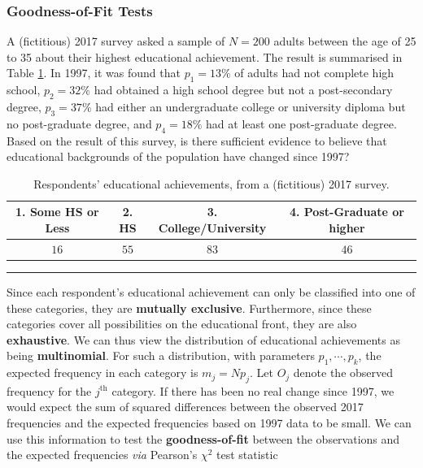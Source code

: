 
\subsubsection{Goodness-of-Fit Tests}
A (fictitious) 2017 survey asked a sample of $N=200$ adults between the age of 25 to 35 about their highest educational achievement. The result is summarised in Table \ref{tab:SA6}. In 1997, it was found that $p_1=13\%$ of adults had not complete high school, $p_2=32\%$ had obtained a high school degree but not a post-secondary degree, $p_3=37\%$ had either an undergraduate college or university diploma but no post-graduate degree, and $p_4=18\%$ had at least one post-graduate degree. Based on the result of this survey, is there sufficient evidence to believe that educational backgrounds of the population have changed since 1997?
     \begin{table}[!t]
         \centering
         \begin{tabular}{c c c c}
         \hline
        \textbf{1. Some HS or Less} & \textbf{2. HS} & \textbf{3. College/University} & \textbf{4. Post-Graduate or higher} \\
         \hline
        $16$ & $55$ & $83$ & $46$ \\
        \hline
         \end{tabular}
         \caption[\small Respondents' educational achievements]{\small Respondents' educational achievements, from a (fictitious) 2017 survey.}
         \label{tab:SA6}\hrule 
     \end{table}
\par Since each respondent's educational achievement can only be classified into one of these categories, they are  \textbf{mutually exclusive}. Furthermore, since these categories cover all possibilities on the educational front, they are also \textbf{exhaustive}. We can thus view the distribution of educational achievements as being \textbf{multinomial}. For such a distribution, with parameters $p_{1},\cdots,p_{k}$, the expected frequency in each category is $m_{j}=Np_{j}$. \newl  Let $O_{j}$ denote the observed frequency for the $j^{\text{th}}$ category. If there has been no real change since 1997, we would expect the sum of squared differences between the observed 2017 frequencies and the expected frequencies based on 1997 data to be small. We can use this information to test the \textbf{goodness-of-fit} between the observations and the expected frequencies \textit{via} Pearson's $\chi^{2}$ test statistic 
